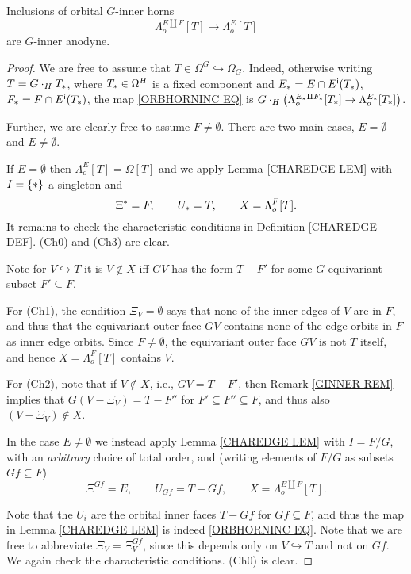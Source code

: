 \documentclass[a4paper,10pt,draft]{article}%
\begin{document}
\begin{proposition}\label{ORB_HORN_PROP}
      Inclusions of orbital $G$-inner horns
\begin{equation}\label{ORBHORNINC EQ}
	\Lambda_o^{E \amalg F}[T] \to \Lambda_o^{E}[T]
\end{equation}
are $G$-inner anodyne.
\end{proposition}


\begin{proof}
We are free to assume that $T \in \Omega^G \hookrightarrow \Omega_G$. Indeed, otherwise writing $T = G \cdot_H T_{\**}$, where $T_{\**} \in \Omega^H$ is a fixed component and 
$E_{\**}=E \cap E^{\mathsf{i}}(T_{\**})$, $F_{\**} = F \cap E^{\mathsf{i}}(T_{\**})$,
the map \eqref{ORBHORNINC EQ} is
$G \cdot_H 
\left( \Lambda_o^{E_{\**} \amalg F_{\**}}[T_{\**}] \to \Lambda_o^{E_{\**}}[T_{\**}]\right)$.

Further, we are clearly free to assume $F \neq \emptyset$.
There are two main cases, 
$E=\emptyset$ and $E\neq \emptyset$.

If $E=\emptyset$ then $\Lambda_o^{E}[T] = \Omega[T]$ and we apply
Lemma \ref{CHAREDGE LEM} with $I = \{\**\}$ a singleton and
\[
	\Xi^{\**} = F, \qquad 
	U_{\**} = T,\qquad
	X=\Lambda_o^{F}[T].
\]
It remains to check the characteristic conditions in Definition \ref{CHAREDGE DEF}.
	(Ch0) and (Ch3) are clear.
	
	Note for $V\hookrightarrow T$ it is $V \not \in X$ iff 
	$GV$ has the form $T-F'$ for some $G$-equivariant subset
	$F' \subseteq F$.

	For (Ch1), the condition $\Xi_{V} = \emptyset$
	says that none of the inner edges of $V$ are in $F$,
	and thus that the equivariant outer face $G V$ contains none of the edge orbits in $F$ as inner edge orbits. Since $F\neq \emptyset$, the equivariant outer face $GV$ is not $T$ itself, 
	and hence $X=\Lambda_o^{F}[T]$ contains $V$.

	For (Ch2), note that if $V \not \in X$, i.e., 
	$GV = T - F'$, then Remark \ref{GINNER REM} implies that
	$G(V-\Xi_V) = T - F''$ for $F'\subseteq F'' \subseteq F$,
	and thus also $(V-\Xi_V) \not \in X$.
	
	In the case $E \neq \emptyset$ we instead apply Lemma \ref{CHAREDGE LEM} with $I = F/G$, with an 
	\textit{arbitrary} choice of total order, and 
	(writing elements of $F/G$ as subsets $Gf \subseteq F$)
\[
	\Xi^{Gf} = E, \qquad 
	U_{G f}= T - Gf, \qquad
	X=\Lambda_o^{E\amalg F}[T].
\]

Note that the $U_i$ are the orbital inner faces $T - Gf$ for $Gf \subseteq F$, and thus the map
in Lemma \ref{CHAREDGE LEM} is indeed \eqref{ORBHORNINC EQ}.
Note that we are free to abbreviate $\Xi_V = \Xi^{Gf}_V$, since this
depends only on $V \hookrightarrow T$ and not on $Gf$.
We again check the characteristic conditions. (Ch0) is clear.


\end{proof}
\end{document}
